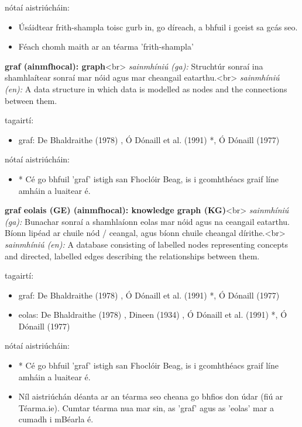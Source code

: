 \documentclass{article}
\begin{document}
nótaí aistriúcháin:
\begin{itemize}
	\item Úsáidtear frith-shampla toisc gurb in, go díreach, a bhfuil i gceist sa gcás seo.
	\item Féach chomh maith ar an téarma 'frith-shampla'
\end{itemize}


\textbf{graf (ainmfhocal): graph}<br>
\textit{sainmhíniú (ga):} Struchtúr sonraí ina shamhlaítear sonraí mar nóid agus mar cheangail eatarthu.<br>
\textit{sainmhíniú (en):} A data structure in which data is modelled as nodes and the connections between them.

tagairtí:
\begin{itemize}
	\item graf: De Bhaldraithe (1978) \cite{de-bhaldraithe}, Ó Dónaill et al. (1991) \cite{focloir-beag}*, Ó Dónaill (1977) \cite{odonaill}
\end{itemize}

nótaí aistriúcháin:
\begin{itemize}
	\item * Cé go bhfuil 'graf' istigh san Fhoclóir Beag, is i gcomhthéacs graif líne amháin a luaitear é.
\end{itemize}


\textbf{graf eolais (GE) (ainmfhocal): knowledge graph (KG)}<br>
\textit{sainmhíniú (ga):} Bunachar sonraí a shamhlaíonn eolas mar nóid agus na ceangail eatarthu. Bíonn lipéad ar chuile nód / ceangal, agus bíonn chuile cheangal dírithe.<br>
\textit{sainmhíniú (en):} A database consisting of labelled nodes representing concepts and directed, labelled edges describing the relationships between them.

tagairtí:
\begin{itemize}
	\item graf: De Bhaldraithe (1978) \cite{de-bhaldraithe}, Ó Dónaill et al. (1991) \cite{focloir-beag}*, Ó Dónaill (1977) \cite{odonaill}
	\item eolas: De Bhaldraithe (1978) \cite{de-bhaldraithe}, Dineen (1934) \cite{dineen}, Ó Dónaill et al. (1991) \cite{focloir-beag}*, Ó Dónaill (1977) \cite{odonaill}
\end{itemize}

nótaí aistriúcháin:
\begin{itemize}
	\item * Cé go bhfuil 'graf' istigh san Fhoclóir Beag, is i gcomhthéacs graif líne amháin a luaitear é.
	\item Níl aistriúchán déanta ar an téarma seo cheana go bhfios don údar (fiú ar Téarma.ie). Cumtar téarma nua mar sin, as 'graf' agus as 'eolas' mar a cumadh i mBéarla é.
\end{itemize}
\end{document}
